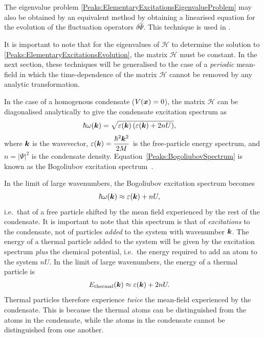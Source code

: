 The eigenvalue problem \eqref{Peaks:ElementaryExcitationsEigenvalueProblem} may also be obtained by an equivalent method by obtaining a linearised equation for the evolution of the fluctuation operators $\delta\hat{\Psi}$.  This technique is used in .

It is important to note that for the eigenvalues of $\mathcal{H}$ to determine the solution to \eqref{Peaks:ElementaryExcitationsEvolution}, the matrix $\mathcal{H}$ must be constant. In the next section, these techniques will be generalised to the case of a \emph{periodic} mean-field in which the time-dependence of the matrix $\mathcal{H}$ cannot be removed by any analytic transformation.

In the case of a homogenous condensate ($V(\bm{x}) = 0$), the matrix $\mathcal{H}$ can be diagonalised analytically to give the condensate excitation spectrum as
\begin{align}
    \hbar \omega(\vect{k}) &= \sqrt{\varepsilon(\vect{k})\left(\varepsilon(\vect{k}) + 2 n U \right)},
    \label{Peaks:BogoliubovSpectrum}
\end{align}
where $\bm{k}$ is the wavevector, $\displaystyle \varepsilon(\bm{k}) = \frac{\hbar^2 \bm{k}^2}{2 M}$ is the free-particle energy spectrum, and $n = \big|\Psi \big|^2$ is the condensate density. Equation~\eqref{Peaks:BogoliubovSpectrum} is known as the Bogoliubov excitation spectrum~\citep{Bogoliubov:1947}.  

In the limit of large wavenumbers, the Bogoliubov excitation spectrum becomes
\begin{align}
    \hbar \omega(\bm{k}) &\approx \varepsilon(\bm{k}) + n U,
\end{align}
i.e.\ that of a free particle shifted by the mean field experienced by the rest of the condensate.  It is important to note that this spectrum is that of \emph{excitations} to the condensate, not of particles \emph{added} to the system with wavenumber $\bm{k}$.  The energy of a thermal particle added to the system will be given by the excitation spectrum \emph{plus} the chemical potential, i.e.\ the energy required to add an atom to the system $n U$.  In the limit of large wavenumbers, the energy of a thermal particle is
\begin{align}
    E_\text{thermal}(\vect{k}) &\approx \varepsilon(\vect{k}) + 2 n U.
    \label{Peaks:ThermalParticleEnergySpectrum}
\end{align}
Thermal particles therefore experience \emph{twice} the mean-field experienced by the condensate.  This is because the thermal atoms can be distinguished from the atoms in the condensate, while the atoms in the condensate cannot be distinguished from one another.

